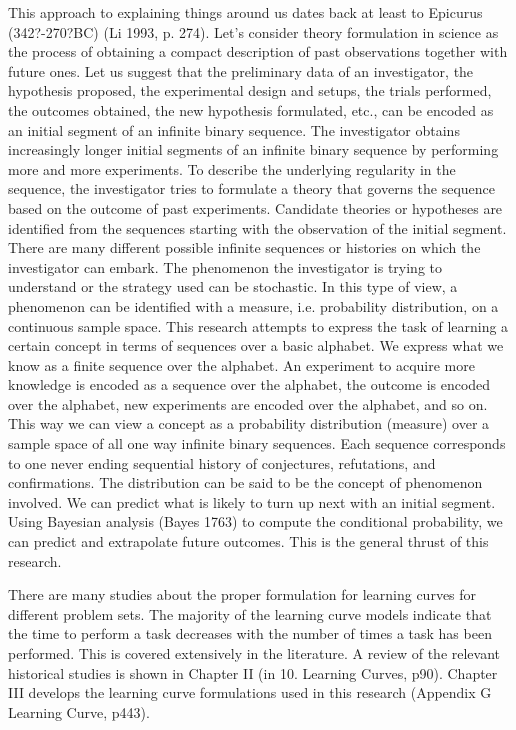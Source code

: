 This approach to explaining things around us dates back at least to Epicurus
(342?-270?BC) (Li 1993, p. 274). Let’s consider theory formulation in science as the
process of obtaining a compact description of past observations together with future ones.
Let us suggest that the preliminary data of an investigator, the hypothesis proposed, the
experimental design and setups, the trials performed, the outcomes obtained, the new
hypothesis formulated, etc., can be encoded as an initial segment of an infinite binary
sequence. The investigator obtains increasingly longer initial segments of an infinite
binary sequence by performing more and more experiments. To describe the underlying
regularity in the sequence, the investigator tries to formulate a theory that governs the
sequence based on the outcome of past experiments. Candidate theories or hypotheses
are identified from the sequences starting with the observation of the initial segment.
There are many different possible infinite sequences or histories on which the
investigator can embark. The phenomenon the investigator is trying to understand or the
strategy used can be stochastic. In this type of view, a phenomenon can be identified
with a measure, i.e. probability distribution, on a continuous sample space.
This research attempts to express the task of learning a certain concept in terms of
sequences over a basic alphabet. We express what we know as a finite sequence over the
alphabet. An experiment to acquire more knowledge is encoded as a sequence over the
alphabet, the outcome is encoded over the alphabet, new experiments are encoded over
the alphabet, and so on. This way we can view a concept as a probability distribution
(measure) over a sample space of all one way infinite binary sequences. Each sequence
corresponds to one never ending sequential history of conjectures, refutations, and
confirmations. The distribution can be said to be the concept of phenomenon involved.
We can predict what is likely to turn up next with an initial segment. Using Bayesian
analysis (Bayes 1763) to compute the conditional probability, we can predict and
extrapolate future outcomes. This is the general thrust of this research.

There are many studies about the proper formulation for learning curves for
different problem sets. The majority of the learning curve models indicate that the time
to perform a task decreases with the number of times a task has been performed. This is
covered extensively in the literature. A review of the relevant historical studies is shown
in Chapter II (in 10. Learning Curves, p90). Chapter III develops the learning curve
formulations used in this research (Appendix G Learning Curve, p443).

